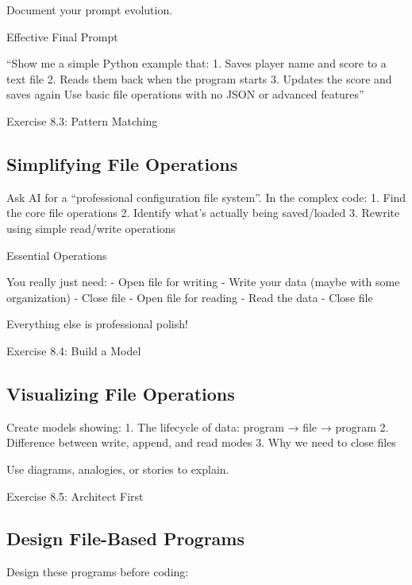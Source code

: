 \documentclass[
  letterpaper,
  DIV=11,
  numbers=noendperiod,
  oneside]{scrreprt}
\begin{document}
Document your prompt evolution.

Effective Final Prompt

``Show me a simple Python example that: 1. Saves player name and score
to a text file 2. Reads them back when the program starts 3. Updates the
score and saves again Use basic file operations with no JSON or advanced
features''

Exercise 8.3: Pattern Matching

\subsection{Simplifying File
Operations}\label{simplifying-file-operations}

Ask AI for a ``professional configuration file system''. In the complex
code: 1. Find the core file operations 2. Identify what's actually being
saved/loaded 3. Rewrite using simple read/write operations

Essential Operations

You really just need: - Open file for writing - Write your data (maybe
with some organization) - Close file - Open file for reading - Read the
data - Close file

Everything else is professional polish!

Exercise 8.4: Build a Model

\subsection{Visualizing File
Operations}\label{visualizing-file-operations}

Create models showing: 1. The lifecycle of data: program → file →
program 2. Difference between write, append, and read modes 3. Why we
need to close files

Use diagrams, analogies, or stories to explain.

Exercise 8.5: Architect First

\subsection{Design File-Based
Programs}\label{design-file-based-programs}

Design these programs before coding:
\end{document}
